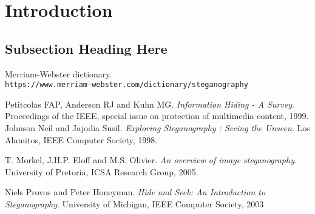 \begin{abstract}
Steganography is the combination between the 2 Greek words : steganós (which means concealed) and graphia(which means writing) \cite{steganography-origin} and has been a method that humanity has used to hide information for more than 2 millenniums \cite{steganography-history}.
This paper presents both existing and new ways of embedding computer files and data into different digital multimedia formats as covert as possible and allowing the encoded information to be retrieved at a later time without any losses.
\end{abstract}

\section[Introduction to computer Steganography]{Introduction}


\begin{multicols}{2}

\subsection{Subsection Heading Here}
\end{multicols}


\begin{thebibliography}{9}
Merriam-Webster dictionary.
\\\texttt{https://www.merriam-webster.com/dictionary/steganography}

Petitcolas FAP, Anderson RJ and Kuhn MG.
\textit{Information Hiding - A Survey}.
Proceedings of the IEEE, special issue on protection of multimedia content, 1999.
Johnson Neil and Jajodia Susil.
\textit{Exploring Steganography : Seeing the Unseen}. 
Los Alamitos, IEEE Computer Society, 1998.

T. Morkel, J.H.P. Eloff and M.S. Olivier. 
\textit{An overview of image steganography}.
University of Pretoria, ICSA Research Group, 2005.

Niels Provos and Peter Honeyman.
\textit{Hide and Seek: An Introduction to Steganography}.
University of Michigan, IEEE Computer Society, 2003

\end{thebibliography}

